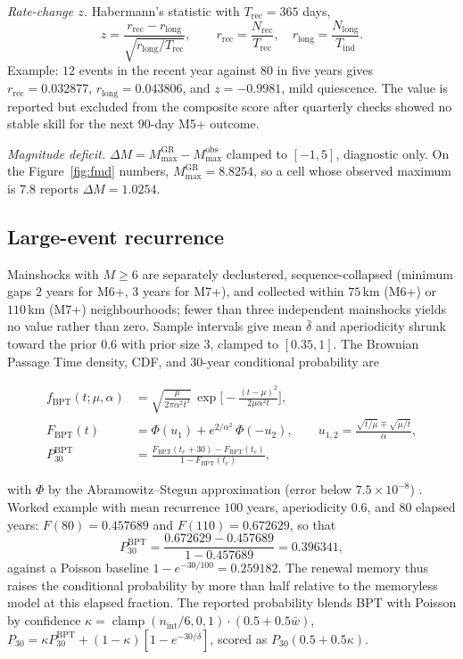 \documentclass[11pt,a4paper]{article}
\DeclareMathOperator{\clamp}{clamp}
\begin{document}
\emph{Rate-change $z$.} Habermann's statistic \cite{habermann1987} with
$T_{\text{rec}}=365$ days,
\begin{equation}
z=\frac{r_{\text{rec}}-r_{\text{long}}}{\sqrt{r_{\text{long}}/T_{\text{rec}}}},
\qquad
r_{\text{rec}}=\frac{N_{\text{rec}}}{T_{\text{rec}}},\quad
r_{\text{long}}=\frac{N_{\text{long}}}{T_{\text{ind}}}.
\end{equation}
Example: $12$ events in
the recent year against $80$ in five years gives
$r_{\text{rec}}=0.032877$, $r_{\text{long}}=0.043806$, and $z=-0.9981$,
mild quiescence. The value is reported but excluded from the composite
score after quarterly checks showed no stable skill for the next $90$-day
M5+ outcome.

\emph{Magnitude deficit.} $\Delta M=M_{\max}^{\mathrm{GR}}-M_{\max}^
{\mathrm{obs}}$ clamped to $[-1,5]$, diagnostic only. On the
Figure~\ref{fig:fmd} numbers, $M_{\max}^{\mathrm{GR}}=8.8254$, so a cell
whose observed maximum is $7.8$ reports $\Delta M=1.0254$.

\subsection{Large-event recurrence}\label{sec:bpt}
Mainshocks with $M\ge6$ are separately declustered, sequence-collapsed
(minimum gaps $2$ years for M6+, $3$ years for M7+), and collected within
$75$\,km (M6+) or $110$\,km (M7+) neighbourhoods; fewer than three
independent mainshocks yields no value rather than zero. Sample intervals
give mean $\bar\delta$ and aperiodicity shrunk toward the prior $0.6$ with
prior size $3$, clamped to $[0.35,1]$. The Brownian Passage Time density,
CDF, and $30$-year conditional probability are

\begin{align}
f_{\mathrm{BPT}}(t;\mu,\alpha)&=
\sqrt{\frac{\mu}{2\pi\alpha^2t^3}}\,
\exp\!\Big[-\frac{(t-\mu)^2}{2\mu\alpha^2t}\Big],\\
F_{\mathrm{BPT}}(t)&=\Phi(u_1)+e^{2/\alpha^2}\,\Phi(-u_2),\qquad
u_{1,2}=\frac{\sqrt{t/\mu}\mp\sqrt{\mu/t}}{\alpha},\\
P_{30}^{\mathrm{BPT}}&=
\frac{F_{\mathrm{BPT}}(t_e+30)-F_{\mathrm{BPT}}(t_e)}
{1-F_{\mathrm{BPT}}(t_e)},
\end{align}

with $\Phi$ by the Abramowitz--Stegun approximation (error below
$7.5\times10^{-8}$) \cite{matthews2002,wgcep2003}. Worked example with mean
recurrence $100$ years, aperiodicity $0.6$, and $80$ elapsed years:
$F(80)=0.457689$ and $F(110)=0.672629$, so that
\begin{equation}
P_{30}^{\mathrm{BPT}}=
\frac{0.672629-0.457689}{1-0.457689}=0.396341,
\end{equation}
against a Poisson baseline $1-e^{-30/100}=0.259182$. The renewal memory
thus raises
the conditional probability by more than half relative to the memoryless
model at this elapsed fraction. The reported probability blends BPT with
Poisson by confidence
$\kappa=\clamp(n_{\text{int}}/6,0,1)\cdot(0.5+0.5\bar w)$,
$P_{30}=\kappa P_{30}^{\mathrm{BPT}}+(1-\kappa)[1-e^{-30/\bar\delta}]$,
scored as $P_{30}(0.5+0.5\kappa)$.
\end{document}
